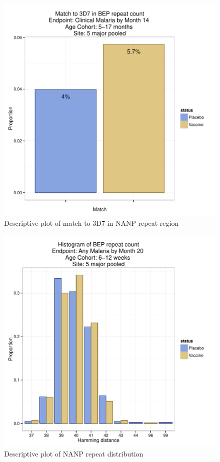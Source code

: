 \documentclass[]{article}
\begin{document}
\begin{figure}[htbp]
\centering
\includegraphics{figures/bep-match-infact-c-1.pdf}
\caption{Descriptive plot of match to 3D7 in NANP repeat region}
\end{figure}

\begin{figure}[htbp]
\centering
\includegraphics{figures/bep-hist-newborn-c-1.pdf}
\caption{Descriptive plot of NANP repeat distribution}
\end{figure}
\end{document}
